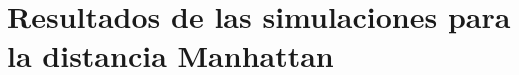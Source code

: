 \documentclass[conference]{IEEEtran}
\begin{document}

\section{Resultados de las simulaciones para la distancia Manhattan}
\end{document}
